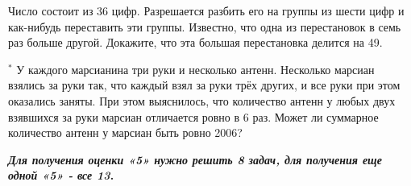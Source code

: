 \begin{thm}
    Число состоит из 36 цифр. Разрешается разбить его на группы из шести цифр и как-нибудь переставить эти группы. Известно, что одна из перестановок в семь раз больше другой. Докажите, что эта большая перестановка делится на 49.
\end{thm}

\begin{thm} $^{\ast}$
    У каждого марсианина три руки и несколько антенн. Несколько марсиан взялись за руки так, что каждый взял за руки трёх других, и все руки при этом оказались заняты. При этом выяснилось, что количество антенн у любых двух взявшихся за руки марсиан отличается ровно в 6 раз. Может ли суммарное количество антенн у марсиан быть ровно 2006?
\end{thm}

\textbf{\textit{Для получения оценки «5» нужно решить 8 задач,  
для получения еще одной «5» - все 13}.}